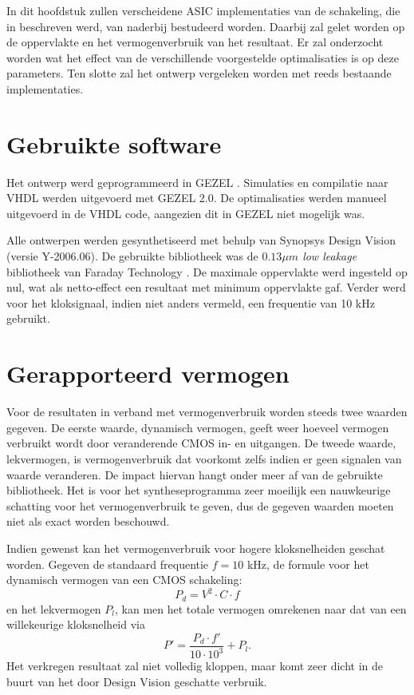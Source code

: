 
In dit hoofdstuk zullen verscheidene ASIC implementaties van de schakeling, die in  beschreven werd, van naderbij bestudeerd worden. Daarbij zal gelet worden op de oppervlakte en het vermogenverbruik van het resultaat. Er zal onderzocht worden wat het effect van de verschillende voorgestelde optimalisaties is op deze parameters. Ten slotte zal het ontwerp vergeleken worden met reeds bestaande implementaties.

\section{Gebruikte software}

Het ontwerp werd geprogrammeerd in GEZEL \cite{gezel}. Simulaties en compilatie naar VHDL werden uitgevoerd met GEZEL 2.0. De optimalisaties werden manueel uitgevoerd in de VHDL code, aangezien dit in GEZEL niet mogelijk was.

Alle ontwerpen werden gesynthetiseerd met behulp van Synopsys Design Vision (versie Y-2006.06). De gebruikte bibliotheek was de \emph{$0.13 \mu m$ low leakage} bibliotheek van Faraday Technology \cite{cell-databook}. De maximale oppervlakte werd ingesteld op nul, wat als netto-effect een resultaat met minimum oppervlakte gaf. Verder werd voor het kloksignaal, indien niet anders vermeld, een frequentie van 10 kHz gebruikt.

\section{Gerapporteerd vermogen}

Voor de resultaten in verband met vermogenverbruik worden steeds twee waarden gegeven. De eerste waarde, dynamisch vermogen, geeft weer hoeveel vermogen verbruikt wordt door veranderende CMOS in- en uitgangen. De tweede waarde, lekvermogen, is vermogenverbruik dat voorkomt zelfs indien er geen signalen van waarde veranderen. De impact hiervan hangt onder meer af van de gebruikte bibliotheek. Het is voor het syntheseprogramma zeer moeilijk een nauwkeurige schatting voor het vermogenverbruik te geven, dus de gegeven waarden moeten niet als exact worden beschouwd.

Indien gewenst kan het vermogenverbruik voor hogere kloksnelheiden geschat worden. Gegeven de standaard frequentie $f = 10$ kHz, de formule voor het dynamisch vermogen van een CMOS schakeling:
\[P_d = V^2 \cdot C \cdot f\]
en het lekvermogen $P_l$, kan men het totale vermogen omrekenen naar dat van een willekeurige kloksnelheid via
\[P' = \frac{P_d \cdot f'}{10 \cdot 10^3} + P_l.\]
Het verkregen resultaat zal niet volledig kloppen, maar komt zeer dicht in de buurt van het door Design Vision geschatte verbruik.

